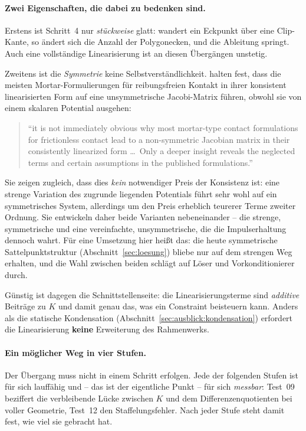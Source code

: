\documentclass[a4paper,11pt]{article}
\def\bm#1{#1}%
\begin{document}
\paragraph{Zwei Eigenschaften, die dabei zu bedenken sind.}
Erstens ist Schritt~4 nur \emph{stückweise} glatt: wandert ein Eckpunkt über eine Clip-Kante, so
ändert sich die Anzahl der Polygonecken, und die Ableitung springt. Auch eine vollständige
Linearisierung ist an diesen Übergängen unstetig.

Zweitens ist die \emph{Symmetrie} keine Selbstverständlichkeit. \citet{hiermeier2018} halten fest,
dass die meisten Mortar-Formulierungen für reibungsfreien Kontakt in ihrer konsistent
linearisierten Form auf eine unsymmetrische Jacobi-Matrix führen, obwohl sie von einem skalaren
Potential ausgehen:
\begin{quote}
\small ``it is not immediately obvious why most mortar-type contact formulations for frictionless
contact lead to a non-symmetric Jacobian matrix in their consistently linearized form \ldots\ Only
a deeper insight reveals the neglected terms and certain assumptions in the published
formulations.'' \hfill \citep[S.~3 des Manuskripts]{hiermeier2018}
\end{quote}
Sie zeigen zugleich, dass dies \emph{kein} notwendiger Preis der Konsistenz ist: eine strenge
Variation des zugrunde liegenden Potentials führt sehr wohl auf ein symmetrisches System,
allerdings um den Preis erheblich teurerer Terme zweiter Ordnung. Sie entwickeln daher beide
Varianten nebeneinander -- die strenge, symmetrische und eine vereinfachte, unsymmetrische, die
die Impulserhaltung dennoch wahrt. Für eine Umsetzung hier heißt das: die heute symmetrische
Sattelpunktstruktur (Abschnitt~\ref{sec:loesung}) bliebe nur auf dem strengen Weg erhalten, und
die Wahl zwischen beiden schlägt auf Löser und Vorkonditionierer durch.

Günstig ist dagegen die Schnittstellenseite: die Linearisierungsterme sind \emph{additive}
Beiträge zu $\bm K$ und damit genau das, was ein Constraint beisteuern kann. Anders als die
statische Kondensation (Abschnitt~\ref{sec:ausblick:kondensation}) erfordert die Linearisierung
\textbf{keine} Erweiterung des Rahmenwerks.

\paragraph{Ein möglicher Weg in vier Stufen.}
Der Übergang muss nicht in einem Schritt erfolgen. Jede der folgenden Stufen ist für sich lauffähig
und -- das ist der eigentliche Punkt -- für sich \emph{messbar}: Test~09 beziffert die verbleibende
Lücke zwischen $\bm K$ und dem Differenzenquotienten bei voller Geometrie, Test~12 den
Staffelungsfehler. Nach jeder Stufe steht damit fest, wie viel sie gebracht hat.
\end{document}
